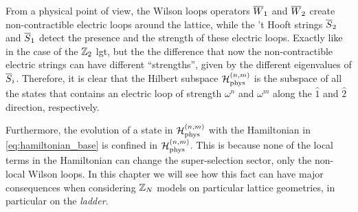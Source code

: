 
From a physical point of view, the Wilson loops operators $\overline{W}_1$ and $\overline{W}_2$ create non-contractible electric loops around the lattice, while  the 't Hooft strings $\overline{S}_2$ and $\overline{S}_1$ detect the presence and the strength of these electric loops.
Exactly like in the case of the $\mathbb{Z}_2$ \ac{lgt}, but the the difference that now the non-contractible electric strings can have different ``strengths'', given by the different eigenvalues of $\overline{S}_i$.
Therefore, it is clear that the Hilbert subspace $\mathcal{H}_{\text{phys}}^{(n, m)}$ is the subspace of all the states that contains an electric loop of strength $\omega^n$ and $\omega^{m}$ along the $\hat{1}$ and $\hat{2}$ direction, respectively.

Furthermore, the evolution of a state in $\mathcal{H}_{\text{phys}}^{(n,m)}$ with the Hamiltonian in \eqref{eq:hamiltonian_base} is confined in $\mathcal{H}_{\text{phys}}^{(n,m)}$.
This is because none of the local terms in the Hamiltonian can change the super-selection sector, only the non-local Wilson loops.
In this chapter we will see how this fact can have major consequences when considering $\mathbb{Z}_N$ models on particular lattice geometries, in particular on the \emph{ladder}.
